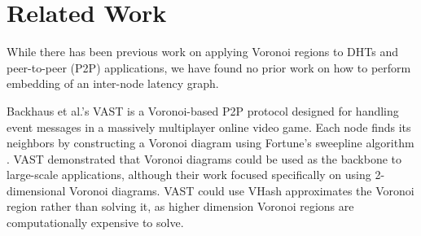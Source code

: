 \documentclass[11pt, conference, letterpaper]{IEEEtran}
\begin{document}


\section{Related Work}
\label{sec:related}
While there has been previous work on applying Voronoi regions to DHTs and peer-to-peer (P2P) applications, we have found no prior work on how to perform embedding of an inter-node latency graph.   

Backhaus et al.'s  VAST \cite{Backhaus:2007:VAS:1326257.1326266} is a Voronoi-based P2P protocol designed for handling event messages in a massively multiplayer online video game.  
Each node finds its neighbors by constructing a Voronoi diagram using Fortune's sweepline algorithm \cite{fortune1987sweepline}.  
VAST demonstrated that Voronoi diagrams could be used as the backbone to large-scale applications, although their work focused specifically on using 2-dimensional Voronoi diagrams.
VAST could use   
VHash approximates the Voronoi region rather than solving it, as higher dimension Voronoi regions are computationally expensive to solve.
\end{document}
